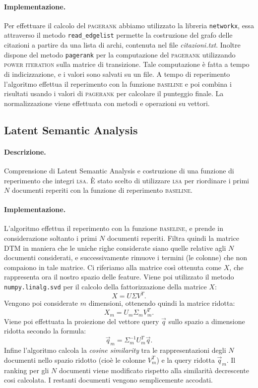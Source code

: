 \paragraph{\textbf{Implementazione.}}
Per effettuare il calcolo del \textsc{pagerank} abbiamo utilizzato la libreria \texttt{networkx}, essa attraverso il metodo \texttt{read\_edgelist} permette la costruzione del grafo delle citazioni a partire da una lista di archi, contenuta nel file \textit{citazioni.txt}. Inoltre dispone del metodo \texttt{pagerank} per la computazione del \textsc{pagerank} utilizzando \textsc{power iteration} sulla matrice di transizione. Tale computazione \`e fatta a tempo di indicizzazione, e i valori sono salvati su un file. A tempo di reperimento l'algoritmo effettua il reperimento con la funzione \textsc{baseline} e poi combina i risultati usando i valori di \textsc{pagerank} per calcolare il punteggio finale. La normalizzazione viene effettuata con metodi e operazioni su vettori.

\subsection{Latent Semantic Analysis}
\label{sec:lsa}

\paragraph{\textbf{Descrizione.}}
Comprensione di Latent Semantic Analysis e costruzione di una funzione di reperimento che integri \textsc{lsa}. \`E stato scelto di utilizzare \textsc{lsa} per riordinare i primi $N$ documenti reperiti con la funzione di reperimento \textsc{baseline}. 

\paragraph{\textbf{Implementazione.}} 
L'algoritmo effettua il reperimento con la funzione \textsc{baseline}, e prende in considerazione soltanto i primi $N$ documenti reperiti. Filtra quindi la matrice DTM in maniera che le uniche righe considerate siano quelle relative agli $N$ documenti considerati, e successivamente rimuove i termini (le colonne) che non compaiono in tale matrice. Ci riferiamo alla matrice cos\`i ottenuta come $X$, che rappresenta ora il nostro spazio delle feature. Viene poi utilizzato il metodo \texttt{numpy.linalg.svd} per il calcolo della fattorizzazione della matrice $X$: 
\[ X = U \Sigma V^{T}. \]
Vengono poi considerate $m$ dimensioni, ottenendo quindi la matrice ridotta: 
\[ X_m = U_m \Sigma_m V^{T}_m. \]
Viene poi effettuata la proiezione del vettore query $\vec{q}$ sullo spazio a dimensione ridotta secondo la formula: 
\[ \vec{q}_m = \Sigma^{-1}_m U^{T}_m \vec{q}. \]
Infine l'algoritmo calcola la \textit{cosine similarity} tra le rappresentazioni degli $N$ documenti nello spazio ridotto (cio\`e le colonne $V^{T}_m$) e la query ridotta $\vec{q}_m$. Il ranking per gli $N$ documenti viene modificato rispetto alla similarit\`a  decrescente cosi calcolata. I restanti documenti vengono semplicemente accodati.

